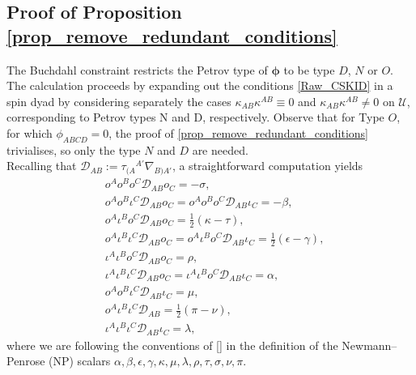 \documentclass[10pt,a4paper]{article}
\theoremstyle{plain}
\begin{document}
\subsection{Proof of Proposition \ref{prop_remove_redundant_conditions}}
\label{Sec:ProofOfProp3}

The Buchdahl constraint restricts the Petrov type of
$\bm\phi$ to be type $D$, $N$ or $O$.
The calculation proceeds by expanding out the
conditions \eqref{Raw_CSKID} in a spin dyad
by considering separately the cases $\kappa_{AB}\kappa^{AB}\equiv 0$
and $\kappa_{AB}\kappa^{AB}\neq 0$ on $\mathcal{U}$, corresponding to Petrov types N and D, respectively.
Observe that for Type $O$, for which $\phi_{ABCD}=0$,
the proof of \ref{prop_remove_redundant_conditions} trivialises,
so only the type $N$ and $D$ are needed.
\\

Recalling that $\mathcal{D}_{AB}:= \tau_{(A}{}^{A'}\nabla_{B)A'}$, a straightforward computation yields 
\begin{align*}
& o^Ao^Bo^C\mathcal{D}_{AB}o_C = -\sigma,\\
& o^Ao^B\iota^C\mathcal{D}_{AB}o_C=o^Ao^Bo^C\mathcal{D}_{AB}\iota_C=-\beta,\\
& o^A\iota^B o^C\mathcal{D}_{AB}o_C = \tfrac{1}{2}(\kappa - \tau),\\
& o^A\iota^B\iota^C\mathcal{D}_{AB}o_C = o^A\iota^B o^C\mathcal{D}_{AB}\iota_C = \tfrac{1}{2}(\epsilon - \gamma),\\
& \iota^A\iota^B o^C\mathcal{D}_{AB}o_C = \rho,\\
& \iota^A\iota^B\iota^C\mathcal{D}_{AB}o_C = \iota^A\iota^B o^C\mathcal{D}_{AB}\iota_C = \alpha,\\
& o^A o^B\iota^C\mathcal{D}_{AB}\iota_C = \mu,\\
& o^A\iota^B\iota^C\mathcal{D}_{AB} = \tfrac{1}{2}(\pi - \nu),\\
& \iota^A\iota^B\iota^C\mathcal{D}_{AB}\iota_C = \lambda	,
\end{align*}
where we are following the conventions of [] in the definition of the Newmann--Penrose (NP) scalars $\alpha, \beta, \epsilon, \gamma, \kappa, \mu, 
\lambda, \rho, \tau, \sigma, \nu, \pi.$
\\
\end{document}

